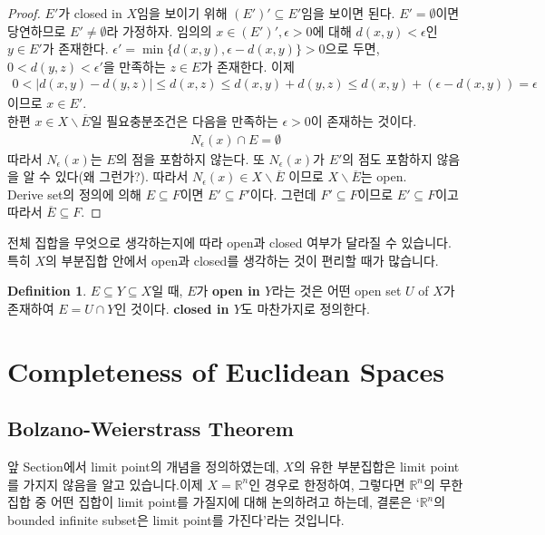 \documentclass[12pt]{article}
\theoremstyle{definition}
\newtheorem{defn}[thm]{Definition}
\def\RR{\mathbb{R}}
\def\eps{\epsilon}
\newcommand{\abs}[1]{\left\vert#1\right\vert}
\begin{document}
	\begin{proof}
		\(E'\)가 closed in \(X\)임을 보이기 위해 \((E')' \subseteq E'\)임을 보이면 된다. \(E' = \emptyset\)이면 당연하므로 \(E' \neq \emptyset\)라 가정하자. 임의의 \(x \in (E')', \eps > 0\)에 대해 \(d(x, y) < \eps\)인 \(y \in E'\)가 존재한다. \(\eps' = \min\{d(x, y), \eps - d(x, y)\} > 0\)으로 두면, \(0 < d(y, z) < \eps'\)을 만족하는 \(z \in E\)가 존재한다. 이제
		\begin{gather*}
			0 < \abs{d(x, y) - d(y, z)} \le  d(x, z) \le d(x, y) + d(y, z) \le d(x, y) + (\eps - d(x, y)) = \eps
		\end{gather*}
		이므로 \(x \in E'\).\\
		한편 \(x \in X \backslash \overline{E}\)일 필요충분조건은 다음을 만족하는 \(\eps > 0\)이 존재하는 것이다.
		\begin{gather*}
			N_\eps (x) \cap E = \emptyset
		\end{gather*}
		따라서 \(N_\eps (x)\)는 \(E\)의 점을 포함하지 않는다. 또 \(N_\eps (x)\)가 \(E'\)의 점도 포함하지 않음을 알 수 있다(왜 그런가?). 따라서 \( N_\eps (x) \in X \backslash \overline{E}\) 이므로 \(X \backslash \overline{E}\)는 open.\\
		Derive set의 정의에 의해 \(E \subseteq F\)이면 \(E' \subseteq F'\)이다. 그런데 \(F' \subseteq F\)이므로 \(E' \subseteq F\)이고 따라서 \(\overline{E} \subseteq F\).
	\end{proof}

전체 집합을 무엇으로 생각하는지에 따라 open과 closed 여부가 달라질 수 있습니다. 특히 \(X\)의 부분집합 안에서 open과 closed를 생각하는 것이 편리할 때가 많습니다.

	\begin{defn}
		\(E \subseteq Y \subseteq X\)일 때, \(E\)가 \textbf{open in \(Y\)}라는 것은 어떤 open set \(U\) of \(X\)가 존재하여 \(E = U \cap Y\)인 것이다. \textbf{closed in \(Y\)}도 마찬가지로 정의한다.
	\end{defn}


\newpage

\section{Completeness of Euclidean Spaces}
\subsection{Bolzano-Weierstrass Theorem}

앞 Section에서 limit point의 개념을 정의하였는데, \(X\)의 유한 부분집합은 limit point를 가지지 않음을 알고 있습니다.이제 \(X=\RR^n\)인 경우로 한정하여, 그렇다면 \(\RR^n\)의 무한집합 중 어떤 집합이 limit point를 가질지에 대해 논의하려고 하는데, 결론은 `\(\RR^n\)의 bounded infinite subset은 limit point를 가진다'라는 것입니다.
\end{document}
